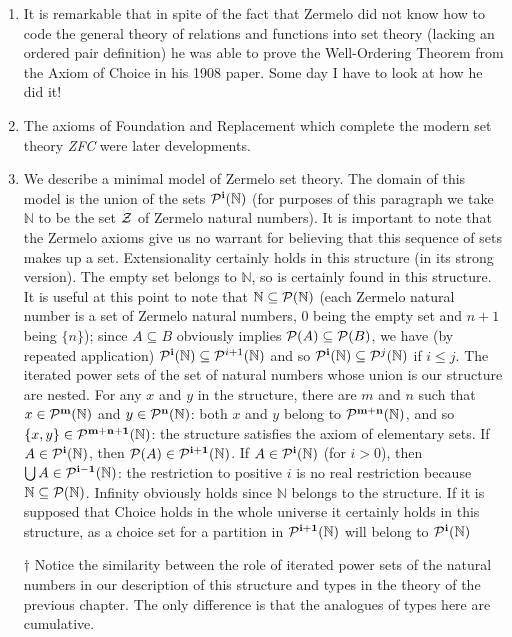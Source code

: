 \documentclass[12pt]{book}
\begin{document}
\begin{enumerate}
\item It is remarkable that in spite of the fact that Zermelo did not know
how to code the general theory of relations and functions into set
theory (lacking an ordered pair definition) he was able to prove the
Well-Ordering Theorem from the Axiom of Choice in his 1908 paper.
Some day I have to look at how he did it!

\item The axioms of Foundation and Replacement which complete the modern set
theory {\em ZFC\/} were later developments.

\item We describe a minimal model of Zermelo set theory.  The domain of this
model is the union of the sets ${\cal P}^{\bf i}({\mathbb N})$ (for purposes of this paragraph we take $\mathbb N$ to be the set $\cal Z$ of Zermelo natural numbers).  It is
important to note that the Zermelo axioms give us no warrant for
believing that this sequence of sets makes up a set.  Extensionality
certainly holds in this structure (in its strong version).  The empty set belongs to $\mathbb
N$, so is certainly found in this structure.  It is useful at this
point to note that ${\mathbb N} \subseteq {\cal P}({\mathbb N})$ (each
Zermelo natural number is a set of Zermelo natural numbers, 0 being
the empty set and $n+1$ being $\{n\}$); since $A \subseteq B$
obviously implies ${\cal P}(A) \subseteq {\cal P}(B)$, we have (by
repeated application) ${\cal P}^{\bf i}({\mathbb N}) \subseteq {\cal
P}^{i+1}({\mathbb N})$ and so ${\cal P}^{\bf i}({\mathbb N})\subseteq {\cal
P}^j({\mathbb N})$ if $i \leq j$.  The iterated power sets of the set
of natural numbers whose union is our structure are nested.  For any
$x$ and $y$ in the structure, there are $m$ and $n$ such that $x\in
{\cal P}^{\bf m}({\mathbb N})$ and $y\in {\cal P}^{\bf n}({\mathbb N})$: both $x$
and $y$ belong to ${\cal P}^{\bf m+n}({\mathbb N})$, and so $\{x,y\} \in
{\cal P}^{\bf m+n+1}({\mathbb N})$: the structure satisfies the axiom of
elementary sets.  If $A \in {\cal P}^{\bf i}({\mathbb N})$, then ${\cal
P}(A) \in {\cal P}^{\bf i+1}({\mathbb N})$.  If $A \in {\cal P}^{\bf i}({\mathbb
N})$ (for $i>0$), then $\bigcup A \in {\cal P}^{\bf i-1}({\mathbb N})$:
the restriction to positive $i$ is no real restriction because
${\mathbb N} \subseteq {\cal P}({\mathbb N})$.  Infinity obviously
holds since $\mathbb N$ belongs to the structure.  If it is supposed
that Choice holds in the whole universe it certainly holds in this
structure, as a choice set for a partition in ${\cal P}^{\bf i+1}({\mathbb
N})$ will belong to ${\cal P}^{\bf i}({\mathbb N})$

$\dagger$ Notice the similarity between the role of iterated power sets of the
natural numbers in our description of this structure and types in the
theory of the previous chapter.  The only difference is that the
analogues of types here are cumulative.

\end{enumerate}
\end{document}
